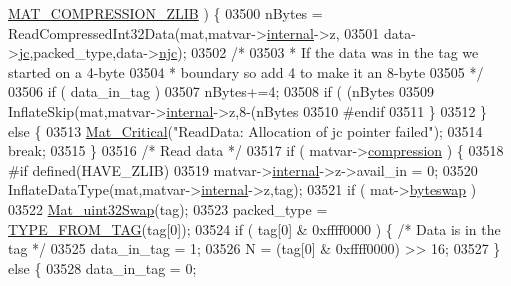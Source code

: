 \begin{DoxyCode}
{{{{{{{{{{{{{{{{{{      \hyperlink{group___m_a_t_gga768c318af97bd2567758ecb001ceb7f4a5181d2f71eab0f12f05ba65d4f13fb53}{MAT\_COMPRESSION\_ZLIB} ) \{
03500                     nBytes = ReadCompressedInt32Data(mat,matvar->\hyperlink{group___m_a_t_a6e97e3ed9f40c49322c18561c2a94e92}{internal}->z,
03501                                  data->\hyperlink{group___m_a_t_ad1e74cdc4f7eff1e47a670297c01da4b}{jc},packed\_type,data->\hyperlink{group___m_a_t_a482d8e4b40aa975f0c1daf146ebe08a4}{njc});
03502                     \textcolor{comment}{/*}
03503 \textcolor{comment}{                     * If the data was in the tag we started on a 4-byte}
03504 \textcolor{comment}{                     * boundary so add 4 to make it an 8-byte}
03505 \textcolor{comment}{                     */}
03506                     \textcolor{keywordflow}{if} ( data\_in\_tag )
03507                         nBytes+=4;
03508                     \textcolor{keywordflow}{if} ( (nBytes %
03509                         InflateSkip(mat,matvar->\hyperlink{group___m_a_t_a6e97e3ed9f40c49322c18561c2a94e92}{internal}->z,8-(nBytes %
03510 \textcolor{preprocessor}{#endif}
03511                 \}
03512             \} \textcolor{keywordflow}{else} \{
03513                 \hyperlink{group__mat__util_gaf51f2bfbb5580f575e4dd79757e2b80c}{Mat\_Critical}(\textcolor{stringliteral}{"ReadData: Allocation of jc pointer failed"});
03514                 \textcolor{keywordflow}{break};
03515             \}
03516             \textcolor{comment}{/*  Read data    */}
03517             \textcolor{keywordflow}{if} ( matvar->\hyperlink{group___m_a_t_aeef0466048621cb2c959ba7f6c774d06}{compression} ) \{
03518 \textcolor{preprocessor}{#if defined(HAVE\_ZLIB)}
03519                 matvar->\hyperlink{group___m_a_t_a6e97e3ed9f40c49322c18561c2a94e92}{internal}->z->avail\_in = 0;
03520                 InflateDataType(mat,matvar->\hyperlink{group___m_a_t_a6e97e3ed9f40c49322c18561c2a94e92}{internal}->z,tag);
03521                 \textcolor{keywordflow}{if} ( mat->\hyperlink{struct__mat__t_a99d207977af5e04941ace56d71817a40}{byteswap} )
03522                     \hyperlink{endian_8c_a8cb0d0750e2eaf9840d95db531934f4f}{Mat\_uint32Swap}(tag);
03523                 packed\_type = \hyperlink{mat5_8c_a82bacecc4afc633b61bc3dc8ef88d1ed}{TYPE\_FROM\_TAG}(tag[0]);
03524                 \textcolor{keywordflow}{if} ( tag[0] & 0xffff0000 ) \{ \textcolor{comment}{/* Data is in the tag */}
03525                     data\_in\_tag = 1;
03526                     N = (tag[0] & 0xffff0000) >> 16;
03527                 \} \textcolor{keywordflow}{else} \{
03528                     data\_in\_tag = 0;
}}}}}}}}}}}}}}}}}}
\end{DoxyCode}
